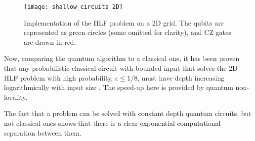 \begin{figure}[!htbp]
\texttt{[image: shallow\_circuits\_2D]}
\captionspacefig \caption{\label{fig:2DHLFgrid} Implementation of the HLF problem on a 2D grid. The qubits are represented as green circles (some omitted for clarity), and CZ gates are drawn in red.}
\end{figure}

Now, comparing the quantum algorithm to a classical one, it has been proven that any probabilistic classical circuit with bounded input that solves the 2D HLF problem with high probability, $\epsilon \leq 1/8$, must have depth increasing logarithmically with input size \cite{bib:bravyi2018quantum}. The speed-up here is provided by quantum non-locality. 

The fact that a problem can be solved with constant depth quantum circuits, but not classical ones shows that there is a clear exponential computational separation between them. 